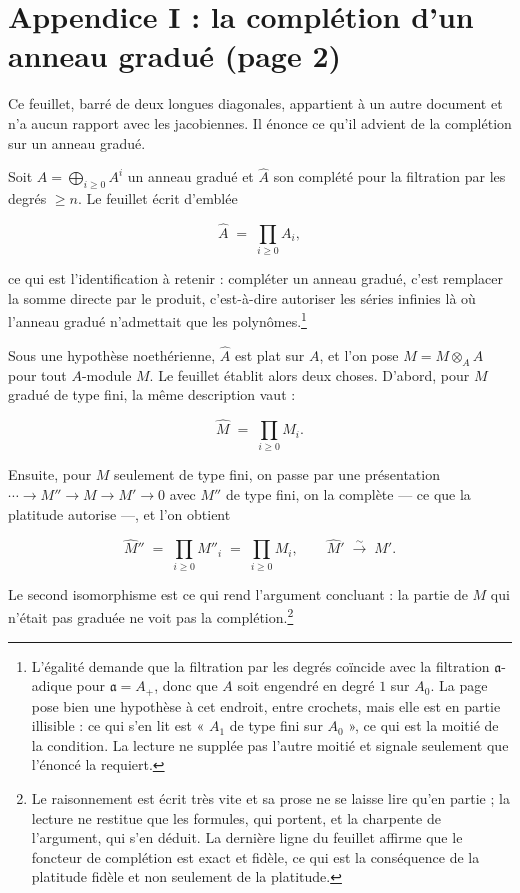 \documentclass[11pt,a4paper]{article}
\begin{document}
\section*{Appendice I : la complétion d'un anneau gradué (page 2)}

Ce feuillet, barré de deux longues diagonales, appartient à un autre document
et n'a aucun rapport avec les jacobiennes. Il énonce ce qu'il advient de la
complétion sur un anneau gradué.

Soit $A = \bigoplus_{i\geq 0} A^{i}$ un anneau gradué et $\hat{A}$ son complété
pour la filtration par les degrés $\geq n$. Le feuillet écrit d'emblée

\[
  \hat{A} \;=\; \prod_{i \geq 0} A_{i},
\]

ce qui est l'identification à retenir : compléter un anneau gradué, c'est
remplacer la somme directe par le produit, c'est-à-dire autoriser les séries
infinies là où l'anneau gradué n'admettait que les
polynômes.\footnote{L'égalité demande que la filtration par les degrés
coïncide avec la filtration $\mathfrak{a}$-adique pour $\mathfrak{a} = A_{+}$,
donc que $A$ soit engendré en degré $1$ sur $A_{0}$. La page pose bien une
hypothèse à cet endroit, entre crochets, mais elle est en partie illisible : ce
qui s'en lit est « $A_{1}$ de type fini sur $A_{0}$ », ce qui est la moitié de
la condition. La lecture ne supplée pas l'autre moitié et signale seulement que
l'énoncé la requiert.}

Sous une hypothèse noethérienne, $\hat{A}$ est plat sur $A$, et l'on pose
$\hat{M} = M\otimes_{A}\hat{A}$ pour tout $A$-module $M$. Le feuillet établit
alors deux choses. D'abord, pour $M$ gradué de type fini, la même description
vaut :

\[
  \hat{M} \;=\; \prod_{i\geq 0} M_{i}.
\]

Ensuite, pour $M$ seulement de type fini, on passe par une présentation
$\cdots \to M''\to M\to M'\to 0$ avec $M''$ de type fini, on la complète — ce
que la platitude autorise —, et l'on obtient

\[
  \hat{M}'' \;=\; \prod_{i\geq 0} M''_{i} \;=\; \prod_{i\geq 0} M_{i},
  \qquad
  \hat{M}' \;\overset{\sim}{\longrightarrow}\; M' .
\]

Le second isomorphisme est ce qui rend l'argument concluant : la partie de $M$
qui n'était pas graduée ne voit pas la complétion.\footnote{Le raisonnement est
écrit très vite et sa prose ne se laisse lire qu'en partie ; la lecture ne
restitue que les formules, qui portent, et la charpente de l'argument, qui s'en
déduit. La dernière ligne du feuillet affirme que le foncteur de complétion est
exact et fidèle, ce qui est la conséquence de la platitude fidèle et non
seulement de la platitude.}
\end{document}
